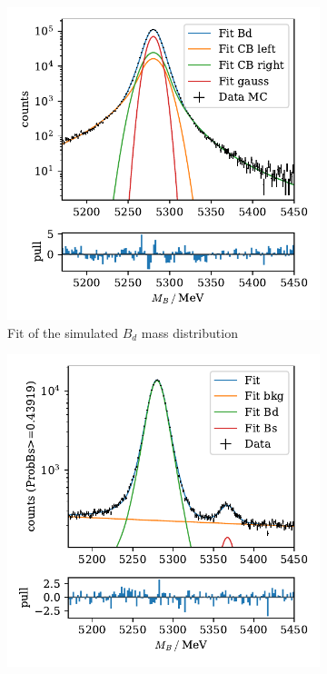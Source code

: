 \begin{figure}
    \centering
    \begin{subfigure}{0.5\textwidth}
        \centering
        \includegraphics[width=\textwidth]{images/fit_mc.pdf}
        \caption{Fit of the simulated $B_d$ mass distribution}
        \label{fig:fit_mc}
    \end{subfigure}%
    \begin{subfigure}{0.5\textwidth}
        \centering
        \includegraphics[width=\textwidth]{images/fit_example.pdf}

\end{subfigure}
\end{figure}
